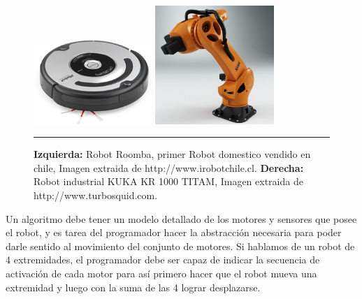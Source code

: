 \begin{figure}[htbp]
	\centering
		\includegraphics[width=0.4\textwidth]{./Figures/roomba.png}
		\includegraphics[width=0.4\textwidth]{./Figures/PR_KR1000_titan_01.jpg}
		\rule{35em}{0.5pt}
	\caption[Roomba y KUKA]{\textbf{Izquierda:} Robot Roomba, primer Robot domestico vendido en chile, Imagen extraida de http://www.irobotchile.cl. \textbf{Derecha:} Robot industrial KUKA KR 1000 TITAM, Imagen extraida de http://www.turbosquid.com.}
	\label{fig:Roomba y KUKA}
\end{figure}

Un algoritmo debe tener un modelo detallado de los motores y sensores que posee el robot, y es tarea del programador hacer la abstracción necesaria para poder darle sentido al movimiento del conjunto de motores. Si hablamos de un robot de 4 extremidades, el programador debe ser capaz de indicar la secuencia de activación de cada motor para así  primero hacer que el robot mueva una extremidad y luego con la suma de las 4 lograr desplazarse.







